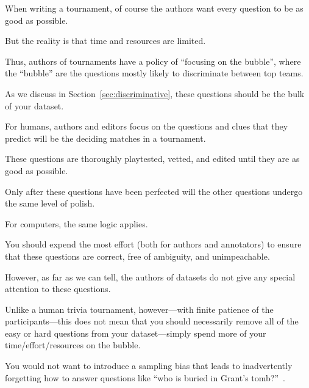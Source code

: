 When writing a tournament, of course the authors want every question to be as good as possible.

But the reality is that time and resources are limited.  

Thus, authors of tournaments have a policy of ``focusing on the bubble'', where the ``bubble'' are the questions mostly likely to discriminate between top teams.

As we discuss in Section~\ref{sec:discriminative}, these questions should be the bulk of your dataset.

For humans, authors and editors focus on the questions and clues that they predict will be the deciding matches in a tournament.

These questions are thoroughly playtested, vetted, and edited until they are as good as possible.

Only after these questions have been perfected will the other questions undergo the same level of polish.

For computers, the same logic applies.  

You should expend the most effort (both for authors and annotators) to ensure that these questions are correct, free of ambiguity, and unimpeachable.

However, as far as we can tell, the authors of \qa{} datasets do not give any special attention to these questions.

Unlike a human trivia tournament, however---with finite patience of the participants---this does not mean that you should necessarily remove all of the easy or hard questions from your dataset---simply spend more of your time/effort/resources on the bubble.

You would not want to introduce a sampling bias that leads to inadvertently forgetting how to answer questions like ``who is buried in Grant's tomb?''~\cite[Chapter 7]{dwan-00}.